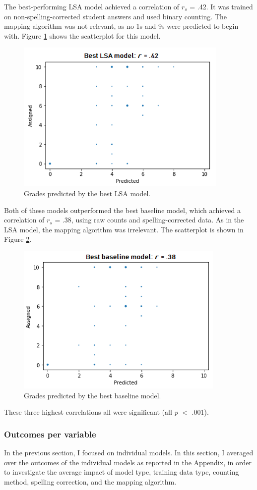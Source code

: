 \documentclass[a4paper,10pt,twoside]{article}
\begin{document}
The best-performing LSA model achieved a correlation of $\textit{r}_s$ = .42. It was trained on non-spelling-corrected student answers and used binary counting. The mapping algorithm was not relevant, as no 1s and 9s were predicted to begin with. Figure \ref{lsa} shows the scatterplot for this model.

\begin{figure}[h]
\centering
\includegraphics[width=0.5\linewidth]{"Best LSA model"}
\caption{Grades predicted by the best LSA model.}
\label{lsa}
\end{figure}

Both of these models outperformed the best baseline model, which achieved a correlation of $\textit{r}_s$ = .38, using raw counts and spelling-corrected data. As in the LSA model, the mapping algorithm was irrelevant. The scatterplot is shown in Figure \ref{baseline}.

\begin{figure}[h]
\centering
\includegraphics[width=0.5\linewidth]{"Best baseline model"}
\caption{Grades predicted by the best baseline model.}
\label{baseline}
\end{figure}

These three highest correlations all were significant (all \textit{p} $<$ .001).

\subsubsection{Outcomes per variable}
In the previous section, I focused on individual models. In this section, I averaged over the outcomes of the individual models as reported in the Appendix, in order to investigate the average impact of model type, training data type, counting method, spelling correction, and the mapping algorithm. 
\end{document}
